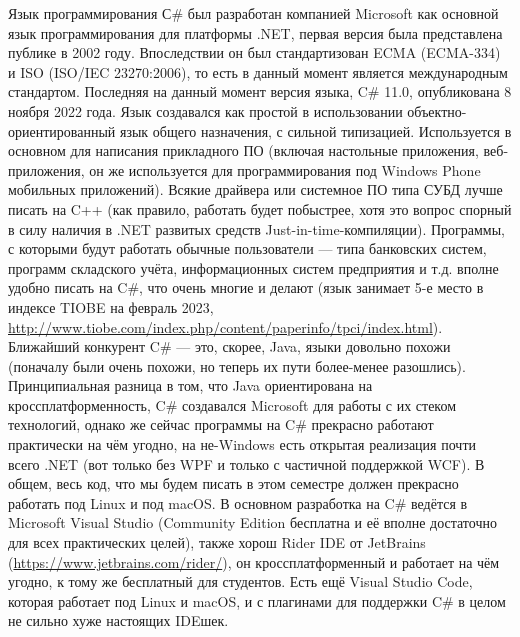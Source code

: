 \documentclass{../../text-style}
\begin{document}
Язык программирования С\# был разработан компанией Microsoft как основной язык программирования для платформы .NET, первая версия была представлена публике в 2002 году. Впоследствии он был стандартизован ECMA (ECMA-334) и ISO (ISO/IEC 23270:2006), то есть в данный момент является международным стандартом. Последняя на данный момент версия языка, C\# 11.0, опубликована 8 ноября 2022 года. Язык создавался как простой в использовании объектно-ориентированный язык общего назначения, с сильной типизацией. Используется в основном для написания прикладного ПО (включая настольные приложения, веб-приложения, он же используется для программирования под Windows Phone мобильных приложений). Всякие драйвера или системное ПО типа СУБД лучше писать на C++ (как правило, работать будет побыстрее, хотя это вопрос спорный в силу наличия в .NET развитых средств Just-in-time-компиляции). Программы, с которыми будут работать обычные пользователи --- типа банковских систем, программ складского учёта, информационных систем предприятия и т.д. вполне удобно писать на C\#, что очень многие и делают (язык занимает 5-е место в индексе TIOBE на февраль 2023, \url{http://www.tiobe.com/index.php/content/paperinfo/tpci/index.html}). Ближайший конкурент C\# --- это, скорее, Java, языки довольно похожи (поначалу были очень похожи, но теперь их пути более-менее разошлись). Принципиальная разница в том, что Java ориентирована на кроссплатформенность, C\# создавался Microsoft для работы с их стеком технологий, однако же сейчас программы на C\# прекрасно работают практически на чём угодно, на не-Windows есть открытая реализация почти всего .NET (вот только без WPF и только с частичной поддержкой WCF). В общем, весь код, что мы будем писать в этом семестре должен прекрасно работать под Linux и под macOS. В основном разработка на C\# ведётся в Microsoft Visual Studio (Community Edition бесплатна и её вполне достаточно для всех практических целей), также хорош Rider IDE от JetBrains (\url{https://www.jetbrains.com/rider/}), он кроссплатформенный и работает на чём угодно, к тому же бесплатный для студентов. Есть ещё Visual Studio Code, которая работает под Linux и macOS, и с плагинами для поддержки C\# в целом не сильно хуже настоящих IDEшек.
\end{document}
